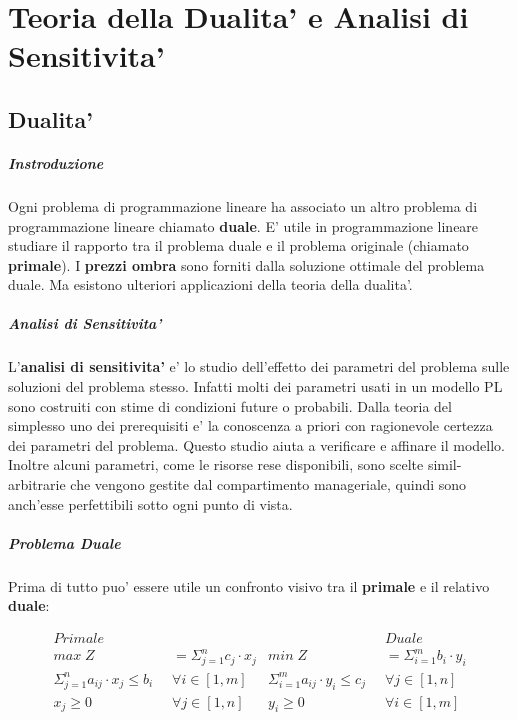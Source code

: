 \chapter{Teoria della Dualita' e Analisi di Sensitivita'}

\section{Dualita'}

\paragraph{Instroduzione}

Ogni problema di programmazione lineare ha associato un altro problema di programmazione lineare chiamato \textbf{duale}.
E' utile in programmazione lineare studiare il rapporto tra il problema duale e il problema originale (chiamato \textbf{primale}).
I \textbf{prezzi ombra} sono forniti dalla soluzione ottimale del problema duale.
Ma esistono ulteriori applicazioni della teoria della dualita'.

\paragraph{Analisi di Sensitivita'}

L'\textbf{analisi di sensitivita'} e' lo studio dell'effetto dei parametri del problema sulle soluzioni del problema stesso.
Infatti molti dei parametri usati in un modello PL sono costruiti con stime di condizioni future o probabili.
Dalla teoria del simplesso uno dei prerequisiti e' la conoscenza a priori con ragionevole certezza dei parametri del problema.
Questo studio aiuta a verificare e affinare il modello.
Inoltre alcuni parametri, come le risorse rese disponibili, sono scelte simil-arbitrarie che vengono gestite dal compartimento manageriale, quindi sono anch'esse perfettibili sotto ogni punto di vista.

\paragraph{Problema Duale}

Prima di tutto puo' essere utile un confronto visivo tra il \textbf{primale} e il relativo \textbf{duale}:

\begin{align*}
    Primale &  &  & Duale \\
    max \; Z &= \Sigma ^ n _ {j=1} c_j \cdot x_j &
    min \; Z &= \Sigma ^ m _ {i=1} b_i \cdot y_i \\
    \Sigma ^ n _ {j=1} a_{ij} \cdot x_{j} \leq b_{i} \; \; & \forall i \in [1,m] &
    \Sigma ^ m _ {i=1} a_{ij} \cdot y_{i} \leq c_{j} \; \; & \forall j \in [1,n] \\
    x_j \geq 0 \; \; & \forall j \in [1,n] &
    y_i \geq 0 \; \; & \forall i \in [1,m] \\
\end{align*}

